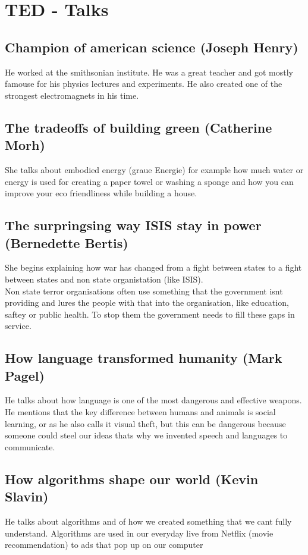 \documentclass{article}
\begin{document}
\section{TED - Talks}
\subsection{Champion of american science (Joseph Henry)}
He worked at the smithsonian institute. He was a great teacher and got mostly famouse for his physics lectures and experiments. He also created one of the strongest electromagnets in his time.
\subsection{The tradeoffs of building green (Catherine Morh)}
She talks about embodied energy (graue Energie) for example how much water or energy is used for creating a paper towel or washing a sponge and how you can improve your eco friendliness while building a house.
\subsection{The surpringsing way ISIS stay in power (Bernedette Bertis)}
She begins explaining how war has changed from a fight between states to a fight between states and non state organistation (like ISIS).\\
Non state terror organisations often use something that the government isnt providing and lures the people with that into the organisation, like education, saftey or public health. To stop them the government needs to fill these gaps in service. 
\subsection{How language transformed humanity (Mark Pagel)}
He talks about how language is one of the most dangerous and effective weapons. He mentions that the key difference between humans and animals is social learning, or as he also calls it visual theft, but this can be dangerous because someone could steel our ideas thats why we invented speech and languages to communicate.
\subsection{How algorithms shape our world (Kevin Slavin)}
He talks about algorithms and of how we created something that we cant fully understand. Algorithms are used in our everyday live from Netflix (movie recommendation) to ads that pop up on our computer
\end{document}
